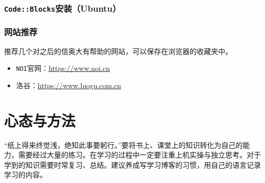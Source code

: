 \subsubsection{\texttt{Code::Blocks}安装（Ubuntu）}

\subsubsection{网站推荐}
推荐几个对之后的信奥大有帮助的网站，可以保存在浏览器的收藏夹中。
\begin{itemize}
\item \texttt{NOI}官网：\href{https://www.noi.cn}{https://www.noi.cn}
\item 洛谷：\href{https://www.luogu.com.cn}{https://www.luogu.com.cn}
\end{itemize}

\section{心态与方法}
“纸上得来终觉浅，绝知此事要躬行。”要将书上、课堂上的知识转化为自己的能力，需要经过大量的练习。在学习的过程中一定要注重上机实操与独立思考。对于学到的知识需要时常复习、总结。建议养成写学习博客的习惯，用自己的语言记录学习的内容。


